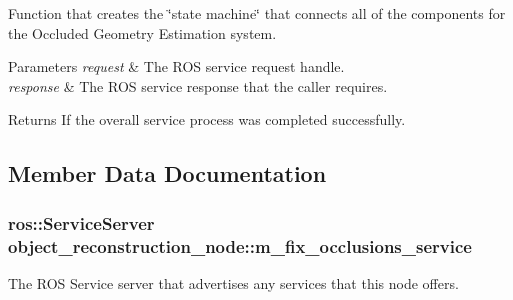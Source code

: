 \-Function that creates the \char`\"{}state machine\char`\"{} that connects all of the components for the \-Occluded \-Geometry \-Estimation system. 


\begin{DoxyParams}{\-Parameters}
{\em request} & \-The \-R\-O\-S service request handle. \\
\hline
{\em response} & \-The \-R\-O\-S service response that the caller requires. \\
\hline
\end{DoxyParams}
\begin{DoxyReturn}{\-Returns}
\-If the overall service process was completed successfully. 
\end{DoxyReturn}


\subsection{\-Member \-Data \-Documentation}
\hypertarget{classobject__reconstruction__node_a0beb4c4e79ee822d4ca5bb320eb8ddfd}{
\subsubsection[{m\-\_\-fix\-\_\-occlusions\-\_\-service}]{\setlength{\rightskip}{0pt plus 5cm}ros\-::\-Service\-Server {\bf object\-\_\-reconstruction\-\_\-node\-::m\-\_\-fix\-\_\-occlusions\-\_\-service}}}\label{classobject__reconstruction__node_a0beb4c4e79ee822d4ca5bb320eb8ddfd}


\-The \-R\-O\-S \-Service server that advertises any services that this node offers. 


